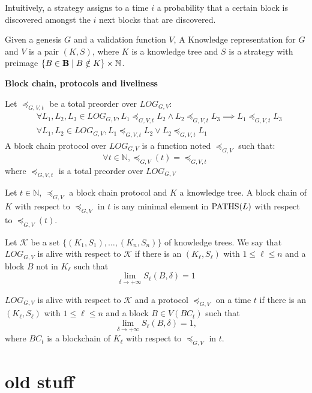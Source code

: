 Intuitively, a strategy assigns to a time $i$ a probability that a certain block is discovered amongst the 
$i$ next blocks that are discovered. 

\begin{mydef}
Given a genesis $G$ and a validation function $V$, 
A Knowledge representation for $G$ and $V$ is a pair $(K,S)$, where $K$ is a knowledge tree and 
$S$ is a strategy with preimage $\{B \in \text{\bf B} \mid B \notin K\} \times \mathbb N$. 
\end{mydef}

\medskip
\noindent
\textbf{Block chain, protocols and liveliness}

\begin{mydef}
	Let $\preceq_{G,V,t}$ be  a total preorder over $LOG_{G,V}$:
\begin{eqnarray*}		
	&\forall L_1, L_2, L_3 \in LOG_{G,V}, L_1 \preceq_{G,V,t} L_2 \land L_2 \preceq_{G,V,t} L_3 \implies L_1 \preceq_{G,V,t} L_3  \\
	&\forall L_1, L_2 \in LOG_{G,V}, L_1 \preceq_{G,V,t} L_2 \lor L_2 \preceq_{G,V,t} L_1 
\end{eqnarray*}
	A block chain protocol over $LOG_{G,V}$ is a function noted $\preceq_{G,V}$ such that: $$ \forall t \in \mathbb{N}, \preceq_{G,V}(t) =  \preceq_{G,V,t}$$ where $\preceq_{G,V,t}$ is a total preorder over $LOG_{G,V}$
\end{mydef}

\begin{mydef}
Let $t \in \mathbb N$, $\preceq_{G,V}$ a block chain protocol and $K$ a knowledge tree. 
A block chain of $K$ with respect to $\preceq_{G,V}$ in $t$ is any minimal element in $\text{PATHS}(L)$ with respect to 
 $\preceq_{G,V}(t)$.
\end{mydef}

Let $\mathcal K$ be a set $\{(K_1,S_1),\dots,(K_n,S_n)\}$ of knowledge trees. 
We say that $LOG_{G,V}$ is alive with respect to $\mathcal K$ if there is an $(K_\ell,S_\ell)$ with $1 \leq \ell \leq n$ 
and a block $B$ not in $K_\ell$ such that 
$$\lim\limits_{\delta\rightarrow +\infty}S_\ell(B,\delta) = 1$$

$LOG_{G,V}$ is alive with respect to $\mathcal K$ and a protocol $\preceq_{G,V}$ on a time $t$
if there is an $(K_\ell,S_\ell)$ with $1 \leq \ell \leq n$ 
and a block $B \in V(BC_t)$ such that 
$$\lim\limits_{\delta\rightarrow +\infty}S_\ell(B,\delta) = 1, $$
where $BC_t$ is a blockchain of $K_\ell$ with respect to $\preceq_{G,V}$ in $t$.

\section{old stuff}

